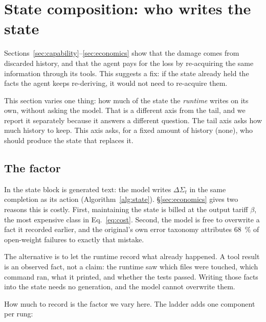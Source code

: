 \section{State composition: who writes the state}
\label{sec:composition}

Sections~\ref{sec:capability}--\ref{sec:economics} show that the damage comes
from discarded history, and that the agent pays for the loss by re-acquiring
the same information through its tools. This suggests a fix: if the state
already held the facts the agent keeps re-deriving, it would not need to
re-acquire them.

This section varies one thing: how much of the state the \emph{runtime}
writes on its own, without asking the model. That is a different axis from
the tail, and we report it separately because it answers a different
question. The tail axis asks how much history to keep. This axis asks, for a
fixed amount of history (none), who should produce the state that replaces
it.



\subsection{The factor}

In \SkillState{} the state block is generated text: the model writes
$\Delta\Sigma_t$ in the same completion as its action
(Algorithm~\ref{alg:state}). \S\ref{sec:economics} gives two reasons this is
costly. First, maintaining the state is billed at the output tariff $\beta$,
the most expensive class in Eq.~\eqref{eq:cost}. Second, the model is free to
overwrite a fact it recorded earlier, and the original's own error taxonomy
attributes \SI{68}{\percent} of open-weight failures to exactly that
mistake\origin.

The alternative is to let the runtime record what already happened. A tool
result is an observed fact, not a claim: the runtime saw which files were
touched, which command ran, what it printed, and whether the tests passed.
Writing those facts into the state needs no generation, and the model cannot
overwrite them.

How much to record is the factor we vary here. The ladder adds one component
per rung:

